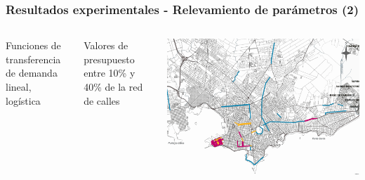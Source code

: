 \documentclass[aspectratio=43, 10pt]{beamer}
\begin{document}
\begin{frame}
    \frametitle{Resultados experimentales - Relevamiento de parámetros (2)}

    \begin{columns}[c]
        \begin{block}{Funciones de transferencia de demanda}
            lineal, logística \parencite{shwe2014, ortuz2011}
        \end{block}

        \begin{block}{Valores de presupuesto}
            entre 10\% y 40\% de la red de calles \parencite{rios2015, shwe2014}
        \end{block}

        \begin{center}
        \includegraphics[width=.8\textwidth]{../resources/bicicircuitos_montevideo.png}
        \end{center}


\end{columns}
\end{frame}
\end{document}
